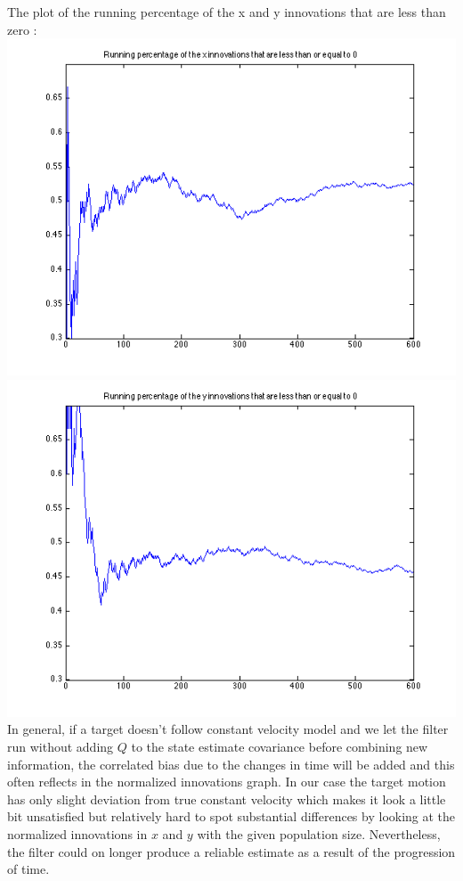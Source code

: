 \documentclass[a4paper]{article}
\begin{document}
The plot of the running percentage of the x and y innovations that are less than zero : \\
\includegraphics[scale=.4]{target_2_x_running_q_0.png}
\includegraphics[scale=.4]{target_2_y_running_q_0.png} \\

In general, if a target doesn't follow constant velocity model and we let the filter run without adding $Q$ to the state estimate covariance before combining new information, the correlated bias due to the changes in time will be added and this often reflects in the normalized innovations graph. In our case the target motion has only slight deviation from true constant velocity which makes it look a little bit unsatisfied but relatively hard to spot substantial differences by looking at the normalized innovations in $x$ and $y$ with the given population size. Nevertheless, the filter could on longer produce a reliable estimate as a result of the progression of time. \\
\end{document}
